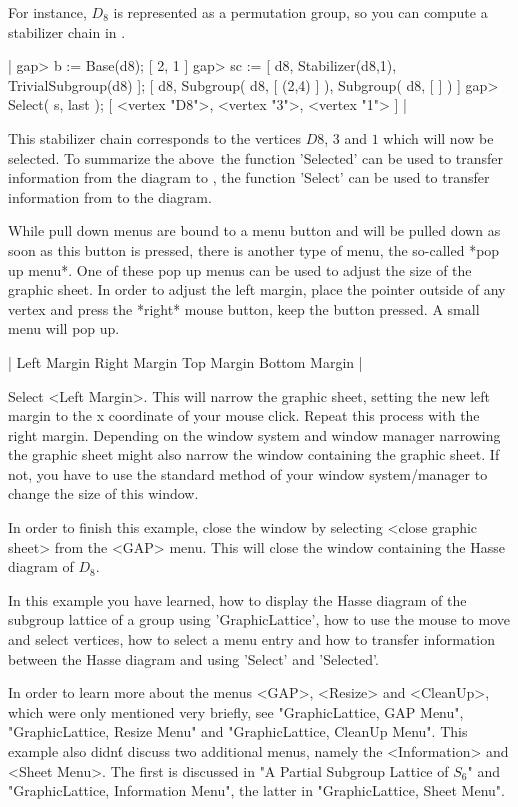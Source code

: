 For instance,  $D_8$ is  represented as  a permutation group,  so you can
compute a stabilizer chain in {\GAP}.

|    gap> b := Base(d8);
    [ 2, 1 ]
    gap> sc := [ d8, Stabilizer(d8,1), TrivialSubgroup(d8) ];
    [ d8, Subgroup( d8, [ (2,4) ] ), Subgroup( d8, [  ] ) ]
    gap> Select( s, last );
    [ <vertex "D8">, <vertex "3">, <vertex "1"> ] |

This stabilizer chain corresponds to the vertices $D8$, $3$ and $1$ which
will now be selected.  To summarize the  above\:\ the function 'Selected'
can  be  used to  transfer  information from the   diagram to {\GAP}, the
function 'Select' can be used to  transfer information from {\GAP} to the
diagram.

While pull down menus are bound to a menu button and  will be pulled down
as soon as  this button is  pressed, there is  another type of  menu, the
so-called *pop up menu*.  One of these pop up menus can be used to adjust
the size of the graphic sheet.  In order to adjust the left margin, place
the pointer  outside of any  vertex and press  the *right*  mouse button,
keep the button pressed.  A small menu will pop up.

|    Left Margin
    Right Margin
    Top Margin
    Bottom Margin |

Select <Left Margin>.   This will narrow  the graphic sheet,  setting the
new left margin  to the x coordinate of   your mouse click.   Repeat this
process with the right margin.  Depending on the window system and window
manager   narrowing  the graphic   sheet   might also   narrow the window
containing  the  graphic sheet.  If  not,  you  have to use  the standard
method of your window system/manager to change the size of this window.

In order to  finish this example, close  the  window by selecting  <close
graphic   sheet>  from  the  <GAP>  menu.    This will  close  the window
containing the Hasse diagram of $D_8$.

In this example you have learned, how to display the Hasse diagram of the
subgroup lattice of a group using  'GraphicLattice', how to use the mouse
to move and  select  vertices, how to select   a  menu entry  and  how to
transfer information between the Hasse diagram  and {\GAP} using 'Select'
and 'Selected'.

In  order to learn  more about  the menus  <GAP>, <Resize> and <CleanUp>,
which  were only mentioned  very briefly, see "GraphicLattice, GAP Menu",
"GraphicLattice, Resize Menu" and  "GraphicLattice, CleanUp Menu".   This
example  also didn\'t    discuss  two   additional  menus,  namely    the
<Information> and <Sheet  Menu>.  The  first is  discussed in "A  Partial
Subgroup Lattice  of $S_6$"  and "GraphicLattice, Information  Menu", the
latter in "GraphicLattice, Sheet Menu".

